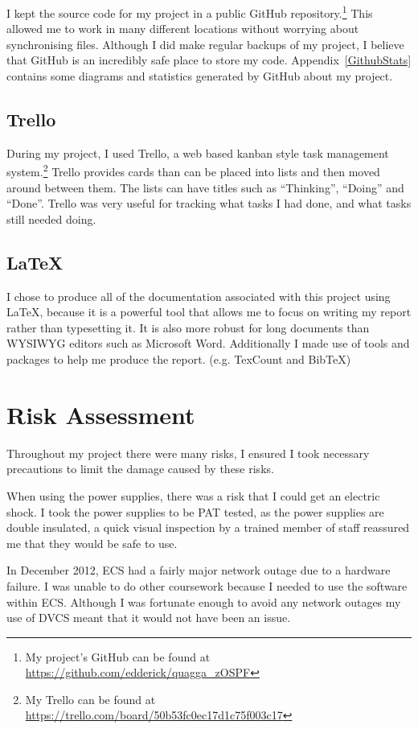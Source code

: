 I kept the source code for my project in a public GitHub repository.\footnote{My
project's GitHub can be found at
\url{https://github.com/edderick/quagga\_zOSPF}} This allowed me to work in
many different locations without worrying about synchronising files. Although
I did make regular backups of my project, I believe that GitHub is an incredibly
safe place to store my code. Appendix~\ref{GithubStats} contains some
diagrams and statistics generated by GitHub about my project. 

\subsection{Trello}
During my project, I used Trello, a web based kanban style task
management system.\footnote{My Trello can be found at
\url{https://trello.com/board/50b53fc0ec17d1c75f003c17}}
Trello provides cards than can be placed into lists and then moved around
between them. The lists can have titles such as ``Thinking'', ``Doing'' and
``Done''. Trello was very useful for tracking what tasks I had done, and what
tasks still needed doing. 

\subsection{\LaTeX}
I chose to produce all of the documentation associated with this project using
\LaTeX, because it is a powerful tool that allows me to focus on writing my
report rather than typesetting it. It is also more robust for long documents
than WYSIWYG editors such as Microsoft Word. Additionally I made use of tools
and packages to help me produce the report. (e.g. TexCount and BibTeX)

\section{Risk Assessment}
Throughout my project there were many risks, I ensured I took necessary
precautions to limit the damage caused by these risks.

When using the power supplies, there was a risk that I could get an electric
shock. I took the power supplies to be PAT tested, as the power supplies are
double insulated, a quick visual inspection by a trained member of staff
reassured me that they would be safe to use.

In December 2012, ECS had a fairly major network outage due to a hardware
failure. I was unable to do other coursework because I needed to use the
software within ECS\@. Although I was fortunate enough to avoid any network
outages my use of DVCS meant that it would not have been an issue.

